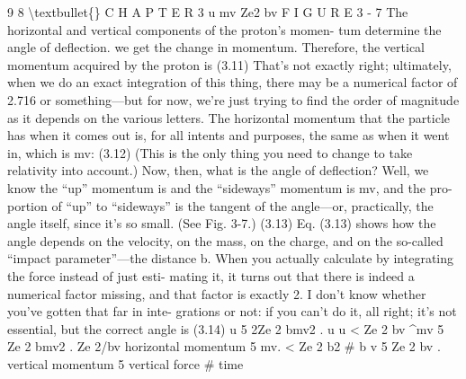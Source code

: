 \documentclass[10pt,oneside]{article}
\begin{document}
9 8 \textbackslash{}textbullet\{\} C H A P T E R  3 u mv Ze2 bv F I G U R E  3 - 7 The horizontal and vertical components of the proton’s momen- tum determine the angle of deflection. we get the change in momentum. Therefore, the vertical momentum acquired by the proton is (3.11) That’s not exactly right; ultimately, when we do an exact integration of this thing, there may be a numerical factor of 2.716 or something---but for now, we’re just trying to find the order of magnitude as it depends on the various letters. The horizontal momentum that the particle has when it comes out is, for all intents and purposes, the same as when it went in, which is mv: (3.12) (This is the only thing you need to change to take relativity into account.) Now, then, what is the angle of deflection? Well, we know the “up” momentum is and the “sideways” momentum is mv, and the pro- portion of “up” to “sideways” is the tangent of the angle---or, practically, the angle itself, since it’s so small. (See Fig. 3-7.) (3.13) Eq. (3.13) shows how the angle depends on the velocity, on the mass, on the charge, and on the so-called “impact parameter”---the distance b. When you actually calculate by integrating the force instead of just esti- mating it, it turns out that there is indeed a numerical factor missing, and that factor is exactly 2. I don’t know whether you’ve gotten that far in inte- grations or not: if you can’t do it, all right; it’s not essential, but the correct angle is (3.14) u 5 2Ze 2 bmv2 . u u < Ze 2 bv \textasciicircum{}mv 5 Ze 2 bmv2 . Ze 2/bv horizontal momentum 5 mv. < Ze 2 b2 \# b v 5 Ze 2 bv . vertical momentum 5 vertical force \# time\par
\end{document}
